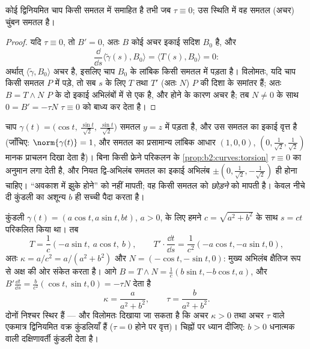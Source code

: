 \begin{proposition}[ऐंठन समतलता मापती है]\label{prop:b2:curves:torsion}
कोई द्विनियमित चाप किसी समतल में समाहित है तभी जब $\tau
\equiv 0$; उस स्थिति में वह समतल (अचर) चुंबन
समतल है।
\end{proposition}

\begin{proof}
यदि $\tau \equiv 0$, तो $B' = 0$, अतः $B$ कोई अचर इकाई
सदिश $B_0$ है, और
\[
\frac{\dd}{\dd s}\langle \tilde\gamma(s), B_0\rangle
= \langle T(s), B_0\rangle = 0 :
\]
अर्थात् $\langle \tilde\gamma, B_0\rangle$ अचर है, इसलिए चाप $B_0$ के लांबिक किसी समतल में
पड़ता है। विलोमतः, यदि चाप किसी समतल $P$ में पड़े, तो सब $s$
के लिए $T$ तथा $T'$ (अतः $N$) $P$ की दिशा के समांतर
हैं; अतः $B = T \wedge N$ $P$ के दो इकाई अभिलंबों में से एक है, और 
होने के कारण अचर है; तब $N \neq 0$ के साथ $0 = B'
= -\tau N$ $\tau \equiv 0$ को बाध्य कर
देता है।
\end{proof}

\begin{example}[झुके हुए वृत्त की ऐंठन शून्य होती है]
चाप $\gamma(t) = \bigl(\cos t,\ \tfrac{\sin t}{\sqrt2},\
\tfrac{\sin t}{\sqrt2}\bigr)$ समतल $y = z$ में पड़ता है, और उस
समतल का इकाई वृत्त है (जाँचिए: $\norm{\gamma(t)} =
1$, और समतल का प्रसामान्य लांबिक आधार $(1,0,0)$,
$(0, \tfrac1{\sqrt2}, \tfrac1{\sqrt2})$ मानक प्राचलन दिखा देता है)। बिना
किसी फ्रेने परिकलन के \cref{prop:b2:curves:torsion} $\tau \equiv 0$ का अनुमान लगा देती है,
और नियत द्वि-अभिलंब समतल का इकाई अभिलंब $\pm(0,
\tfrac1{\sqrt2}, -\tfrac1{\sqrt2})$ ही होना
चाहिए।  ``अवकाश में झुके होने'' को नहीं मापती; वह किसी समतल को
\emph{छोड़ने} को मापती है। केवल नीचे दी कुंडली का अशून्य $b$ ही
सच्ची  पैदा करता है।
\end{example}

\begin{example}[कुंडली]\label{ex:b2:curves:helixfrenet}
कुंडली $\gamma(t) = (a\cos t, a\sin t, bt)$, $a > 0$, के लिए हमने
$c = \sqrt{a^2 + b^2}$ के साथ $s = ct$ परिकलित किया था। तब
\[
T = \frac1c(-a\sin t,\ a\cos t,\ b),
\qquad
T' \cdot \frac{\dd t}{\dd s}
= \frac{1}{c^2}(-a\cos t, -a\sin t, 0),
\]
अतः $\kappa = a/c^2 = a/(a^2 + b^2)$ और $N = (-\cos t, -\sin t,
0)$: मुख्य अभिलंब क्षैतिज रूप से अक्ष की ओर संकेत करता है।
आगे $B = T \wedge N = \frac1c(b\sin t, -b\cos t, a)$, और $B'
\frac{\dd t}{\dd s} = \frac{b}{c^2}(\cos t, \sin t, 0) = -\tau N$
देता है
\[
\boxed{\ \kappa = \frac{a}{a^2 + b^2}, \qquad
\tau = \frac{b}{a^2 + b^2}. \ }
\]
दोनों निश्चर स्थिर हैं --- और विलोमतः दिखाया जा सकता है कि अचर $\kappa > 0$
तथा अचर $\tau$ वाले एकमात्र द्विनियमित वक्र कुंडलियाँ हैं
($\tau = 0$ होने पर वृत्त)। चिह्नों पर ध्यान दीजिए: $b >
0$ धनात्मक  वाली दक्षिणावर्ती कुंडली देता है।
\end{example}

